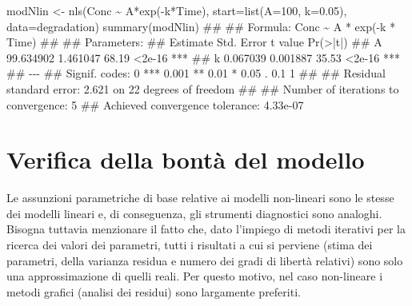 \documentclass[a4paper,12pt,oneside]{book}
\newenvironment{Shaded}{\begin{snugshade}}{\end{snugshade}}
\newcommand{\DecValTok}[1]{#1}
\newcommand{\FloatTok}[1]{#1}
\newcommand{\SpecialCharTok}[1]{#1}
\newcommand{\DocumentationTok}[1]{#1}
\newcommand{\OtherTok}[1]{#1}
\newcommand{\FunctionTok}[1]{#1}
\newcommand{\AttributeTok}[1]{#1}
\newcommand{\NormalTok}[1]{#1}
\begin{document}
\begin{Shaded}
\begin{Highlighting}[]
\NormalTok{modNlin }\OtherTok{\textless{}{-}} \FunctionTok{nls}\NormalTok{(Conc }\SpecialCharTok{\textasciitilde{}}\NormalTok{ A}\SpecialCharTok{*}\FunctionTok{exp}\NormalTok{(}\SpecialCharTok{{-}}\NormalTok{k}\SpecialCharTok{*}\NormalTok{Time), }
               \AttributeTok{start=}\FunctionTok{list}\NormalTok{(}\AttributeTok{A=}\DecValTok{100}\NormalTok{, }\AttributeTok{k=}\FloatTok{0.05}\NormalTok{), }
               \AttributeTok{data=}\NormalTok{degradation)}
\FunctionTok{summary}\NormalTok{(modNlin)}
\DocumentationTok{\#\# }
\DocumentationTok{\#\# Formula: Conc \textasciitilde{} A * exp({-}k * Time)}
\DocumentationTok{\#\# }
\DocumentationTok{\#\# Parameters:}
\DocumentationTok{\#\#    Estimate Std. Error t value Pr(\textgreater{}|t|)    }
\DocumentationTok{\#\# A 99.634902   1.461047   68.19   \textless{}2e{-}16 ***}
\DocumentationTok{\#\# k  0.067039   0.001887   35.53   \textless{}2e{-}16 ***}
\DocumentationTok{\#\# {-}{-}{-}}
\DocumentationTok{\#\# Signif. codes:  0 \textquotesingle{}***\textquotesingle{} 0.001 \textquotesingle{}**\textquotesingle{} 0.01 \textquotesingle{}*\textquotesingle{} 0.05 \textquotesingle{}.\textquotesingle{} 0.1 \textquotesingle{} \textquotesingle{} 1}
\DocumentationTok{\#\# }
\DocumentationTok{\#\# Residual standard error: 2.621 on 22 degrees of freedom}
\DocumentationTok{\#\# }
\DocumentationTok{\#\# Number of iterations to convergence: 5 }
\DocumentationTok{\#\# Achieved convergence tolerance: 4.33e{-}07}
\end{Highlighting}
\end{Shaded}

\hypertarget{verifica-della-bontuxe0-del-modello}{%
\section{Verifica della bontà del modello}\label{verifica-della-bontuxe0-del-modello}}

Le assunzioni parametriche di base relative ai modelli non-lineari sono le stesse dei modelli lineari e, di conseguenza, gli strumenti diagnostici sono analoghi. Bisogna tuttavia menzionare il fatto che, dato l'impiego di metodi iterativi per la ricerca dei valori dei parametri, tutti i risultati a cui si perviene (stima dei parametri, della varianza residua e numero dei gradi di libertà relativi) sono solo una approssimazione di quelli reali. Per questo motivo, nel caso non-lineare i metodi grafici (analisi dei residui) sono largamente preferiti.
\end{document}
